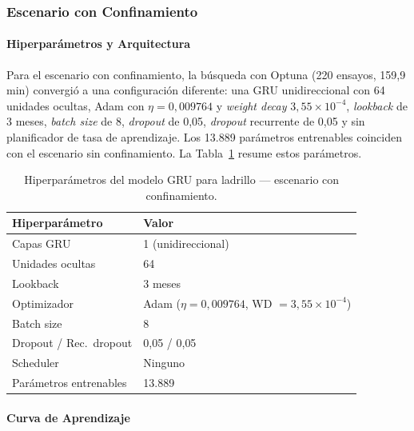 
\subsubsection{Escenario con Confinamiento}

\paragraph{Hiperparámetros y Arquitectura}

\justify
Para el escenario con confinamiento, la búsqueda con Optuna (220 ensayos, 159,9 min) convergió a una configuración diferente: una GRU unidireccional con 64 unidades ocultas, Adam con $\eta = 0{,}009764$ y \textit{weight decay} $3{,}55 \times 10^{-4}$, \textit{lookback} de 3 meses, \textit{batch size} de 8, \textit{dropout} de 0{,}05, \textit{dropout} recurrente de 0{,}05 y sin planificador de tasa de aprendizaje. Los 13.889 parámetros entrenables coinciden con el escenario sin confinamiento. La Tabla~\ref{tab:gru_ladrillo_cc_arq} resume estos parámetros.

\begin{table}[H]
    \centering
    \caption{Hiperparámetros del modelo GRU para ladrillo --- escenario con confinamiento.}
    \label{tab:gru_ladrillo_cc_arq}
    \begin{tabular}{ll}
        \toprule
        \textbf{Hiperparámetro} & \textbf{Valor} \\
        \midrule
        Capas GRU              & 1 (unidireccional) \\
        Unidades ocultas       & 64 \\
        Lookback               & 3 meses \\
        Optimizador            & Adam ($\eta=0{,}009764$, WD $=3{,}55 \times 10^{-4}$) \\
        Batch size             & 8 \\
        Dropout / Rec.\ dropout & 0{,}05 / 0{,}05 \\
        Scheduler              & Ninguno \\
        Parámetros entrenables & 13.889 \\
        \bottomrule
    \end{tabular}
\end{table}

\clearpage
\paragraph{Curva de Aprendizaje}

